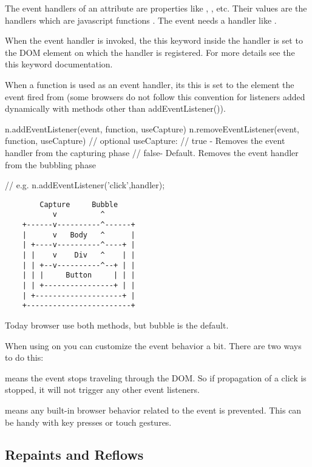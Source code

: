 The event handlers of an attribute are properties like ,
, etc. Their values are the handlers which are javascript
functions . The event  needs a handler
like .


When the event handler is invoked, the this keyword inside the handler is set
to the DOM element on which the handler is registered. For more details see
the this keyword documentation.

When a function is used as an event handler, its this is set to the element
the event fired from (some browsers do not follow this convention for
listeners added dynamically with methods other than addEventListener()).

\begin{js}
  n.addEventListener(event, function, useCapture)
  n.removeEventListener(event, function, useCapture)
  // optional useCapture:
  //    true - Removes the event handler from the capturing phase
  //    false- Default. Removes the event handler from the bubbling phase

  // e.g.
  n.addEventListener('click',handler);
\end{js}


\begin{verbatim}
        Capture     Bubble
           v          ^
    +------v----------^------+
    |      v   Body   ^      |
    | +----v----------^----+ |
    | |    v    Div   ^    | |
    | | +--v----------^--+ | |
    | | |     Button     | | |
    | | +----------------+ | |
    | +--------------------+ |
    +------------------------+
\end{verbatim}

Today browser use both methods, but bubble is the default.

When using on you can customize the event behavior a bit. There are two ways
to do this:

 means the event stops traveling through the DOM. So
if propagation of a click is stopped, it will not trigger any other event
listeners.

 means any built-in browser behavior related to the
event is prevented. This can be handy with key presses or touch gestures.



\subsection{Repaints and Reflows}

